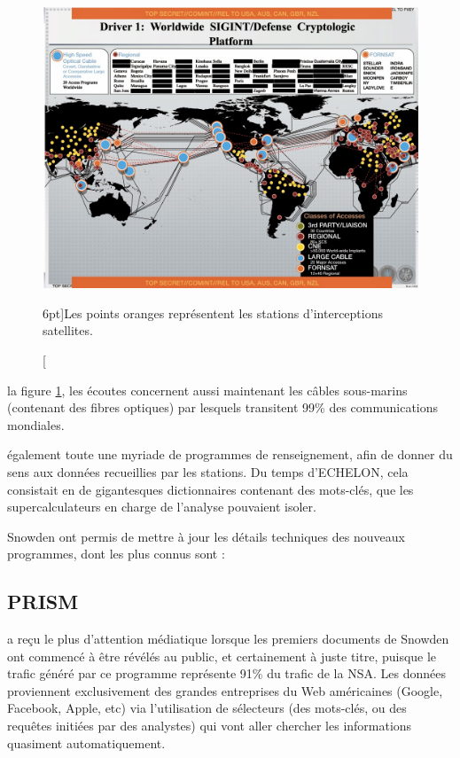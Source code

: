 \vspace{0.7cm}
\begin{figure}
\includegraphics{carte.jpg}
\caption[Carte des stations d'interceptions][6pt]{Les points oranges
représentent les stations d'interceptions satellites.}
\label{fig:stations}
\end{figure}

 la figure \ref{fig:stations}, les écoutes
concernent aussi maintenant les câbles sous-marins (contenant des fibres optiques) par
lesquels transitent 99\% des communications mondiales. 

 également toute une myriade de programmes de
renseignement, afin de donner du sens aux données recueillies par les stations.
Du temps d'ECHELON, cela consistait en de gigantesques dictionnaires contenant
des mots-clés, que les supercalculateurs en charge de l'analyse pouvaient
isoler.

 Snowden ont permis de mettre à jour les détails
techniques des nouveaux programmes, dont les plus connus sont :

\subsection{PRISM}
 a reçu le plus d'attention médiatique
lorsque les premiers documents de Snowden ont commencé à être révélés au public,
et certainement à juste titre, puisque le trafic généré par ce programme
représente 91\% du trafic de la NSA\autocite{WP91}. Les données proviennent
exclusivement des grandes entreprises du Web américaines (Google, Facebook,
Apple, etc) via l'utilisation de sélecteurs (des mots-clés, ou des requêtes
initiées par des analystes) qui vont aller chercher les informations quasiment
automatiquement.

